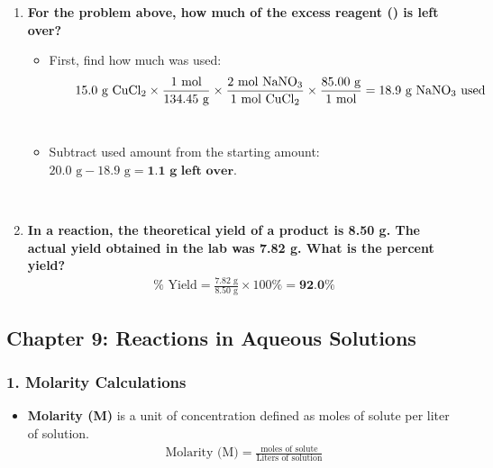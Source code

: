 \documentclass{article}
\begin{document}
\begin{enumerate}[itemsep=5pt]
    \item \textbf{For the problem above, how much of the excess reagent () is left over?}
    \begin{itemize}
        \item First, find how much  was used:
        \begin{align*}
            15.0 \text{ g } \ce{CuCl2} \times \frac{1 \text{ mol}}{134.45 \text{ g}} \times \frac{2 \text{ mol } \ce{NaNO3}}{1 \text{ mol } \ce{CuCl2}} \times \frac{85.00 \text{ g}}{1 \text{ mol}} = 18.9 \text{ g } \ce{NaNO3} \text{ used}
        \end{align*}
        \item Subtract used amount from the starting amount: $20.0 \text{ g} - 18.9 \text{ g} = \textbf{1.1 g left over}$.
    \end{itemize}

    \item \textbf{In a reaction, the theoretical yield of a product is 8.50 g. The actual yield obtained in the lab was 7.82 g. What is the percent yield?}
    \begin{align*}
        \% \text{ Yield} = \frac{7.82 \text{ g}}{8.50 \text{ g}} \times 100\% = \textbf{92.0\%}
    \end{align*}
\end{enumerate}

\bigskip
\subsection*{Chapter 9: Reactions in Aqueous Solutions}

\subsubsection*{1. Molarity Calculations}
\begin{itemize}[itemsep=5pt]
    \item \textbf{Molarity (M)} is a unit of concentration defined as moles of solute per liter of solution.
    \begin{align*}
        \text{Molarity (M)} = \frac{\text{moles of solute}}{\text{Liters of solution}}
    \end{align*}
\end{itemize}
\end{document}
